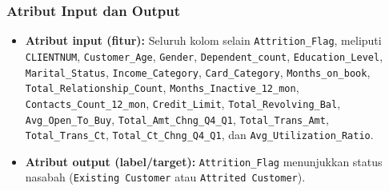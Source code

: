 \documentclass[a4paper,oneside,12pt]{report}
\begin{document}
\subsubsection{Atribut Input dan Output}
\begin{itemize}
    \item \textbf{Atribut input (fitur):} Seluruh kolom selain \texttt{Attrition\_Flag}, meliputi \texttt{CLIENTNUM}, \texttt{Customer\_Age}, \texttt{Gender}, \texttt{Dependent\_count}, \texttt{Education\_Level}, \texttt{Marital\_Status}, \texttt{Income\_Category}, \texttt{Card\_Category}, \texttt{Months\_on\_book}, \texttt{Total\_Relationship\_Count}, \texttt{Months\_Inactive\_12\_mon}, \texttt{Contacts\_Count\_12\_mon}, \texttt{Credit\_Limit}, \texttt{Total\_Revolving\_Bal}, \texttt{Avg\_Open\_To\_Buy}, \texttt{Total\_Amt\_Chng\_Q4\_Q1}, \texttt{Total\_Trans\_Amt}, \texttt{Total\_Trans\_Ct}, \texttt{Total\_Ct\_Chng\_Q4\_Q1}, dan \texttt{Avg\_Utilization\_Ratio}.
    \item \textbf{Atribut output (label/target):} \texttt{Attrition\_Flag} menunjukkan status nasabah (\texttt{Existing Customer} atau \texttt{Attrited Customer}).
\end{itemize}
\end{document}
